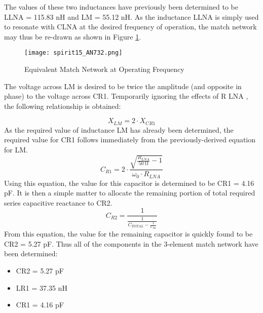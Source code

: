         The values of these two inductances have previously been determined to be LLNA = 115.83 nH 
        and LM = 55.12 nH. As the inductance LLNA is simply used to resonate with CLNA at the 
        desired frequency of operation, the match network may thus be re-drawn as shown in Figure 
        \ref{EXP001:fig_spirit15}.

        \begin{figure}[ht!] %
          \centering
          \texttt{[image: spirit15\_AN732.png]}
          \caption{Equivalent Match Network at Operating Frequency \cite[s.~10]{AN643SiliconLabs}}
          \label{EXP001:fig_spirit15}
        \end{figure}
        
        The voltage across LM is desired to be twice the amplitude (and opposite in phase) to the 
        voltage across CR1. Temporarily ignoring the effects of R LNA , the following relationship 
        is obtained:
        
        \begin{equation}\label{EXP001:eq_spirit16}
         X_{LM} = 2\cdot X_{CR1}
        \end{equation}
        As the required value of inductance LM has already been determined, the required value for 
        CR1 follows immediately from the previously-derived equation for LM.
        \begin{equation}\label{EXP001:eq_spirit17}
          C_{R1} = 2\cdot\frac{\sqrt{\frac{R_{LNA}}{\qty{50}{\ohm}}-1}}{\omega_0\cdot R_{LNA}}
        \end{equation}
        Using this equation, the value for this capacitor is determined to be CR1 = 4.16 pF. It is 
        then a simple matter to allocate the remaining portion of total required series capacitive 
        reactance to CR2.
        \begin{equation}\label{EXP001:eq_spirit18}
          C_{R2} = \frac{1}{\frac{1}{C_{TOTAL}-\frac{1}{C_{R1}}}}
        \end{equation}
        From this equation, the value for the remaining capacitor is quickly found to be CR2 = 5.27 
        pF. Thus all of the components in the 3-element match network have been determined:
        \begin{itemize}[noitemsep]
          \item CR2 = 5.27 pF
          \item LR1 = 37.35 nH
          \item CR1 = 4.16 pF
        \end{itemize}
        
